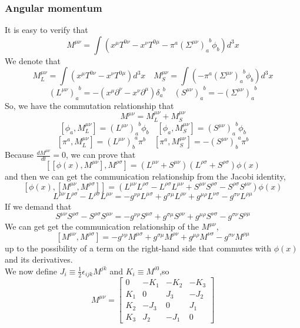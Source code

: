 \documentclass{article}
\begin{document}
\subsubsection{Angular momentum}
It is easy to verify that
\[M^{\mu \nu} = \int (x^{\mu}T^{0\nu}-x^{\nu}T^{0\mu}-\pi^a(\Sigma^{\mu \nu})_{a}^{\phantom{a}b}\phi_b) d^3 x\]
We denote that
\[M_{L}^{\mu \nu} = \int (x^{\mu}T^{0\nu}-x^{\nu}T^{0\mu}) d^3 x \quad M_S^{\mu \nu} = \int (-\pi^a(\Sigma^{\mu \nu})_{a}^{\phantom{a}b}\phi_b) d^3 x\]
\[(L^{\mu \nu})_a^{\phantom{a}b} = -(x^{\mu}\partial^{\nu}-x^{\nu}\partial^{\mu})\delta_a^{\phantom{a}b} \quad (S^{\mu \nu})_a^{\phantom{a}b} = -(\Sigma^{\mu \nu})_a^{\phantom{a}b}\]
So, we have the commutation relationship that
\[M^{\mu \nu} = M_L^{\mu \nu} + M_S^{\mu \nu}\]
\[[\phi_a,M_L^{\mu \nu}] = (L^{\mu \nu})_a^{\phantom{a}b} \phi_b \quad [\phi_a,M_S^{\mu \nu}] = (S^{\mu \nu})_a^{\phantom{a}b} \phi_b\]
\[[\pi^a,M_L^{\mu \nu}] = (L^{\mu \nu})_b^{\phantom{b}a}\pi^{b}  \quad [\pi^a,M_S^{\mu \nu}] = - (S^{\mu \nu})_b^{\phantom{b}a} \pi^b \]
Because $\frac{d M^{\mu \nu}}{dt} = 0$, we can prove that
\[[[\phi(x),M^{\mu \nu}],M^{\rho \sigma}] = (L^{\mu \nu}+S^{\mu \nu})(L^{\rho \sigma}+S^{\rho \sigma})\phi(x)\]
and then we can get the communication relationship from the Jacobi identity,
\[[\phi(x),[M^{\mu \nu},M^{\rho \sigma}]] = (L^{\mu \nu}L^{\rho \sigma}-L^{\rho \sigma}L^{\mu \nu} + S^{\mu \nu}S^{\rho \sigma}-S^{\rho \sigma}S^{\mu \nu})\phi(x)\]
\[L^{\mu \nu}L^{\rho \sigma}-L^{\rho \sigma}L^{\mu \nu} = -g^{\nu \rho}L^{\mu \sigma} + g^{\sigma \mu}L^{\rho \nu} + g^{\mu \rho}L^{\nu \sigma} - g^{\sigma \nu}L^{\rho \mu}\]
If we demand that
\[S^{\mu \nu}S^{\rho \sigma}-S^{\rho \sigma}S^{\mu \nu} = -g^{\nu \rho}S^{\mu \sigma} + g^{\sigma \mu}S^{\rho \nu} + g^{\mu \rho}S^{\nu \sigma} - g^{\sigma \nu}S^{\rho \mu}\]
We can get get the communication relationship of the $M^{\mu \nu}$,
\[[M^{\mu \nu},M^{\rho \sigma}] = -g^{\nu \rho}M^{\mu \sigma} + g^{\sigma \mu}M^{\rho \nu} + g^{\mu \rho}M^{\nu \sigma} - g^{\sigma \nu}M^{\rho \mu}\]
up to the possibility of a term on the right-hand side that commutes with $\phi(x)$ and its derivatives.\\
We now define $J_i \equiv \frac{1}{2} \epsilon_{ijk} M^{jk}$ and $K_i \equiv M^{i0}$,so
\[M^{\mu \nu} = \left[ 
\begin{matrix} 
0   & -K_1 & -K_2 & -K_3 \\ 
K_1 & 0    & J_3  & -J_2 \\
K_2 & -J_3 & 0    &  J_1 \\
K_3 & J_2  & -J_1 &  0
\end{matrix} 
\right]\] 
\end{document}
